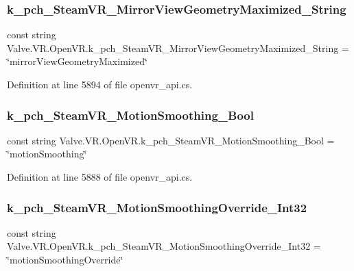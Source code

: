 \subsubsection{\texorpdfstring{k\_pch\_SteamVR\_MirrorViewGeometryMaximized\_String}{k\_pch\_SteamVR\_MirrorViewGeometryMaximized\_String}}
{\footnotesize\ttfamily const string Valve.\+V\+R.\+Open\+V\+R.\+k\+\_\+pch\+\_\+\+Steam\+V\+R\+\_\+\+Mirror\+View\+Geometry\+Maximized\+\_\+\+String = \char`\"{}mirror\+View\+Geometry\+Maximized\char`\"{}}



Definition at line 5894 of file openvr\+\_\+api.\+cs.

\mbox{\label{class_valve_1_1_v_r_1_1_open_v_r_a6451c3909c435d3342db988862a9674a}} 
\subsubsection{\texorpdfstring{k\_pch\_SteamVR\_MotionSmoothing\_Bool}{k\_pch\_SteamVR\_MotionSmoothing\_Bool}}
{\footnotesize\ttfamily const string Valve.\+V\+R.\+Open\+V\+R.\+k\+\_\+pch\+\_\+\+Steam\+V\+R\+\_\+\+Motion\+Smoothing\+\_\+\+Bool = \char`\"{}motion\+Smoothing\char`\"{}}



Definition at line 5888 of file openvr\+\_\+api.\+cs.

\mbox{\label{class_valve_1_1_v_r_1_1_open_v_r_ad693e90763138f4e8bfb1087478f7263}} 
\subsubsection{\texorpdfstring{k\_pch\_SteamVR\_MotionSmoothingOverride\_Int32}{k\_pch\_SteamVR\_MotionSmoothingOverride\_Int32}}
{\footnotesize\ttfamily const string Valve.\+V\+R.\+Open\+V\+R.\+k\+\_\+pch\+\_\+\+Steam\+V\+R\+\_\+\+Motion\+Smoothing\+Override\+\_\+\+Int32 = \char`\"{}motion\+Smoothing\+Override\char`\"{}}



